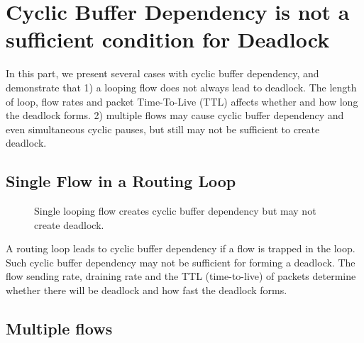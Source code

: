 \section{Cyclic Buffer Dependency is not a sufficient condition for Deadlock}\label{sec:casestudy}

In this part, we present several cases with cyclic buffer dependency, and demonstrate 
that 1) a looping flow does not always lead to deadlock. The length of loop, flow rates and packet
Time-To-Live (TTL) affects whether and how long the deadlock forms. 
2) multiple flows may cause cyclic buffer dependency and even simultaneous cyclic pauses,
but still may not be sufficient to create deadlock. 


\subsection{Single Flow in a Routing Loop}

\begin{figure}[t]
\centering
{}
\caption{Single looping flow creates cyclic buffer dependency but may not create deadlock.}
\label{fig:case2}
\end{figure}


A routing loop leads to cyclic buffer dependency if a flow is trapped in the loop.
Such cyclic buffer dependency may not be sufficient for forming a deadlock. The flow
sending rate, draining rate and the TTL (time-to-live) of packets determine whether
there will be deadlock and how fast the deadlock forms.





\subsection{Multiple flows}

